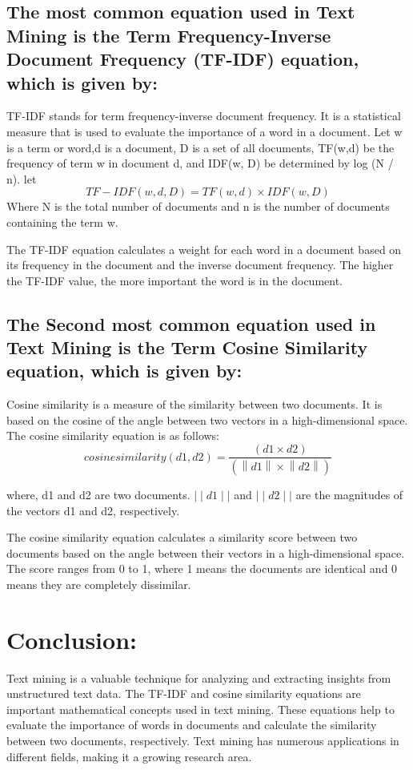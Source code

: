 \documentclass{article}
\begin{document}
\subsection{The most common equation used in Text Mining is the Term Frequency-Inverse Document Frequency (TF-IDF) equation, which is given by:}
TF-IDF stands for term frequency-inverse document frequency. It is a statistical measure that is used to evaluate the importance of a word in a document.
Let w is a term or word,d is a document, D is a set of all documents, TF(w,d) be the frequency of term w in document d, and IDF(w, D) be determined by log (N / n).
let
\[TF-IDF(w,d,D) = TF(w,d)\times{IDF(w,D)}\]
Where N is the total number of documents and n is the number of documents containing the term w.

The TF-IDF equation calculates a weight for each word in a document based on its frequency in the document and the inverse document frequency. The higher the TF-IDF value, the more important the word is in the document.

\subsection{The Second most common equation used in Text Mining is the Term Cosine Similarity equation, which is given by:}
Cosine similarity is a measure of the similarity between two documents. It is based on the cosine of the angle between two vectors in a high-dimensional space. The cosine similarity equation is as follows:
\[cosine similarity(d1,d2) =\dfrac{(d1\times{d2})}{(\left \| d1 \right \|\times{\left \| d2 \right \|})}\]

where,
d1 and d2 are two documents.
$\mid  \mid d1 \mid\mid$ and $\mid\mid d2 \mid\mid$ are the magnitudes of the vectors d1 and d2, respectively.

The cosine similarity equation calculates a similarity score between two documents based on the angle between their vectors in a high-dimensional space. The score ranges from 0 to 1, where 1 means the documents are identical and 0 means they are completely dissimilar.


\section{Conclusion:}
Text mining is a valuable technique for analyzing and extracting insights from unstructured text data. The TF-IDF and cosine similarity equations are important mathematical concepts used in text mining. These equations help to evaluate the importance of words in documents and calculate the similarity between two documents, respectively. Text mining has numerous applications in different fields, making it a growing research area.
\end{document}

